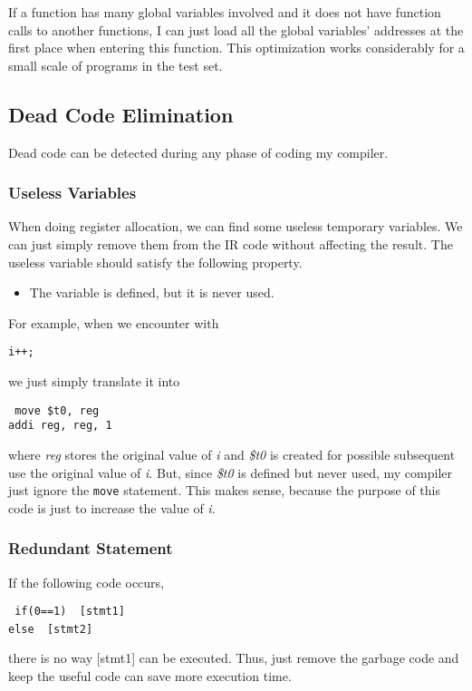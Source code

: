 \documentclass[journal]{IEEEtran}
\begin{document}
If a function has many global variables involved and it does not have function calls to another functions, I can just load all the global variables' addresses at the first place when entering this function. This optimization works considerably for a small scale of programs in the test set.

\subsection{Dead Code Elimination}

Dead code can be detected during any phase of coding my compiler.

\subsubsection{Useless Variables}

When doing register allocation, we can find some useless temporary variables. We can just simply remove them from the IR code without affecting the result. The useless variable should satisfy the following property.
\begin{itemize}
\item The variable is defined, but it is never used.
\end{itemize}

For example, when we encounter with 
\begin{center}
\texttt{i++;}
\end{center}
we just simply translate it into 
\begin{center}
\texttt{
move \$t0, reg \ \  \ \ \ \\
addi reg, reg, 1 \\
}
\end{center}
where \textit{reg} stores the original value of \textit{i} and \textit{\$t0} is created for possible subsequent use the original value of \textit{i}. But, since \textit{\$t0} is defined but never used, my compiler just ignore the \texttt{move} statement. This makes sense, because the purpose of this code is just to increase the value of \textit{i}.

\subsubsection{Redundant Statement}

If the following code occurs,
\begin{center}
\texttt{
if(0==1)
{
	[stmt1]
} \\
else
{
	[stmt2]
}
} \ \ 
\end{center}
there is no way [stmt1] can be executed. Thus, just remove the garbage code and keep the useful code can save more execution time. 
\end{document}
